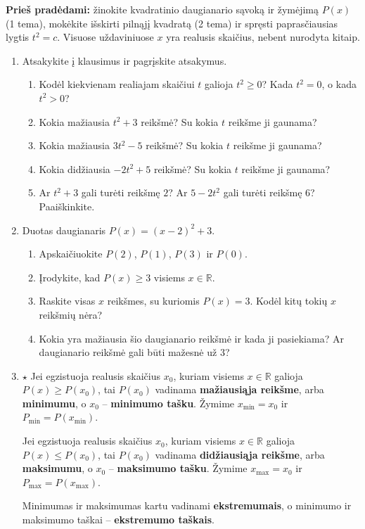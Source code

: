\documentclass[12pt,a4paper]{article}
\begin{document}
\textbf{Prieš pradėdami:} žinokite kvadratinio daugianario sąvoką ir žymėjimą $P(x)$ (1 tema), mokėkite išskirti pilnąjį kvadratą (2 tema) ir spręsti paprasčiausias lygtis $t^2=c$. Visuose uždaviniuose $x$ yra realusis skaičius, nebent nurodyta kitaip.
\begin{enumerate}
\item Atsakykite į klausimus ir pagrįskite atsakymus.
\begin{enumerate}
\item Kodėl kiekvienam realiajam skaičiui $t$ galioja $t^2\ge0$? Kada $t^2=0$, o kada $t^2>0$?
\item Kokia mažiausia $t^2+3$ reikšmė? Su kokia $t$ reikšme ji gaunama?
\item Kokia mažiausia $3t^2-5$ reikšmė? Su kokia $t$ reikšme ji gaunama?
\item Kokia didžiausia $-2t^2+5$ reikšmė? Su kokia $t$ reikšme ji gaunama?
\item Ar $t^2+3$ gali turėti reikšmę $2$? Ar $5-2t^2$ gali turėti reikšmę $6$? Paaiškinkite.
\end{enumerate}
\item Duotas daugianaris $P(x)=(x-2)^2+3$.
\begin{enumerate}
\item Apskaičiuokite $P(2)$, $P(1)$, $P(3)$ ir $P(0)$.
\item Įrodykite, kad $P(x)\ge3$ visiems $x\in\mathbb R$.
\item Raskite visas $x$ reikšmes, su kuriomis $P(x)=3$. Kodėl kitų tokių $x$ reikšmių nėra?
\item Kokia yra mažiausia šio daugianario reikšmė ir kada ji pasiekiama? Ar daugianario reikšmė gali būti mažesnė už $3$?
\end{enumerate}
\item $\star$ Jei egzistuoja realusis skaičius $x_0$, kuriam visiems $x\in\mathbb R$ galioja $P(x)\ge P(x_0)$, tai $P(x_0)$ vadinama \textbf{mažiausiąja reikšme}, arba \textbf{minimumu}, o $x_0$ – \textbf{minimumo tašku}. Žymime $x_{\min}=x_0$ ir $P_{\min}=P(x_{\min})$.

Jei egzistuoja realusis skaičius $x_0$, kuriam visiems $x\in\mathbb R$ galioja $P(x)\le P(x_0)$, tai $P(x_0)$ vadinama \textbf{didžiausiąja reikšme}, arba \textbf{maksimumu}, o $x_0$ – \textbf{maksimumo tašku}. Žymime $x_{\max}=x_0$ ir $P_{\max}=P(x_{\max})$.

Minimumas ir maksimumas kartu vadinami \textbf{ekstremumais}, o minimumo ir maksimumo taškai – \textbf{ekstremumo taškais}.


\end{enumerate}
\end{document}
